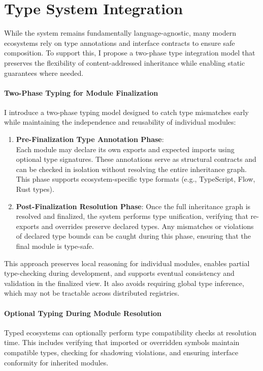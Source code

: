 \documentclass[sigplan,screen]{acmart}
\begin{document}
\section{Type System Integration}
\label{sec:type-system-integration}

While the system remains fundamentally language-agno\-stic, many modern ecosystems rely on type annotations and interface contracts to ensure safe composition. To support this, I propose a two-phase type integration model that preserves the flexibility of content-addressed inheritance while enabling static guarantees where needed.

\paragraph{Two-Phase Typing for Module Finalization}
I introduce a two-phase typing model designed to catch type mismatches early while maintaining the independence and reusability of individual modules:

\begin{enumerate}
	\item \textbf{Pre-Finalization Type Annotation Phase}: \\Each module may declare its own exports and expected imports using optional type signatures. These annotations serve as structural contracts and can be checked in isolation without resolving the entire inheritance graph. This phase supports ecosystem-specific type formats (e.g., TypeScript, Flow, Rust types).
	\item \textbf{Post-Finalization Resolution Phase}: Once the full inheritance graph is resolved and finalized, the system performs type unification, verifying that re-exports and overrides preserve declared types. Any mismatches or violations of declared type bounds can be caught during this phase, ensuring that the final module is type-safe.
\end{enumerate}

This approach preserves local reasoning for individual modules, enables partial type-checking during development, and supports eventual consistency and validation in the finalized view. It also avoids requiring global type inference, which may not be tractable across distributed registries.

\paragraph{Optional Typing During Module Resolution}
Typ\-ed ecosystems can optionally perform type compatibility checks at resolution time. This includes verifying that imported or overridden symbols maintain compatible types, checking for shadowing violations, and ensuring interface conformity for inherited modules.
\end{document}
